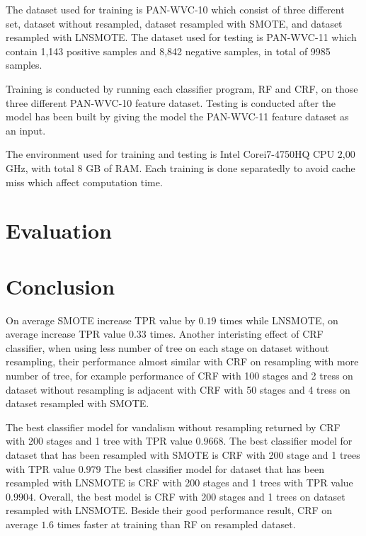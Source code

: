 

The dataset used for training is PAN-WVC-10 which consist of three different
set, dataset without resampled, dataset resampled with SMOTE, and dataset
resampled with LNSMOTE.
The dataset used for testing is PAN-WVC-11 which contain 1,143 positive
samples and 8,842 negative samples, in total of 9985 samples.

Training is conducted by running each classifier program, RF and CRF, on
those three different PAN-WVC-10 feature dataset.
Testing is conducted after the model has been built by giving the model the
PAN-WVC-11 feature dataset as an input.

The environment used for training and testing is Intel\textregistered
Core\texttrademark i7-4750HQ CPU 2,00 GHz, with total 8 GB of RAM.
Each training is done separatedly to avoid cache miss which affect computation
time.


\section{Evaluation}
	\label{section:result_and_analysis}
	

\section{Conclusion}
\label{section:conclusion}

On average SMOTE increase TPR value by $0.19$ times while LNSMOTE, on average
increase TPR value $0.33$ times.
Another interisting effect of CRF classifier, when using less number of tree on
each stage on dataset without resampling, their performance almost similar with
CRF on resampling with more number of tree, for example performance of CRF with
100 stages and 2 tress on dataset without resampling is adjacent with CRF with
50 stages and 4 tress on dataset resampled with SMOTE.

The best classifier model for vandalism without resampling returned by CRF with
200 stages and 1 tree with TPR value $0.9668$.
The best classifier model for dataset that has been resampled with SMOTE is CRF
with 200 stage and 1 trees with TPR value $0.979$
The best classifier model for dataset that has been resampled with LNSMOTE is
CRF with 200 stages and 1 trees with TPR value $0.9904$.
Overall, the best model is CRF with 200 stages and 1 trees on dataset resampled
with LNSMOTE.
Beside their good performance result, CRF on average $1.6$ times faster at
training than RF on resampled dataset.


